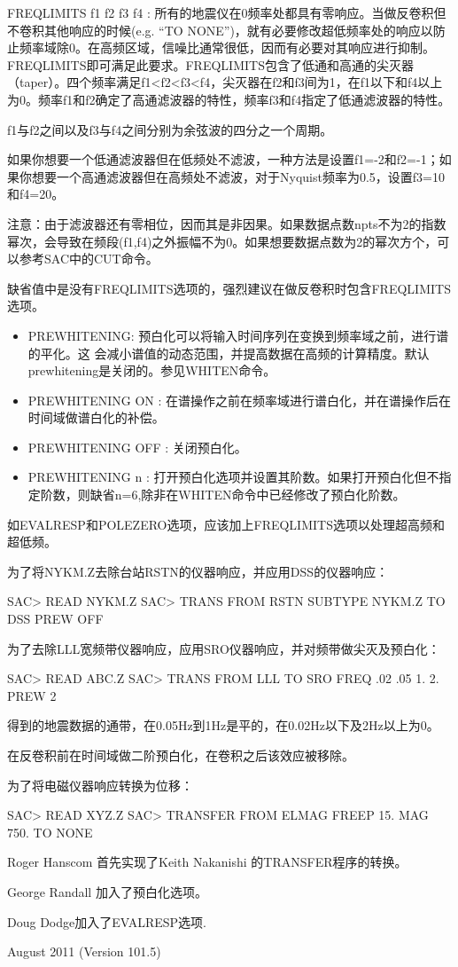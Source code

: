 FREQLIMITS f1 f2 f3 f4 : 所有的地震仪在0频率处都具有零响应。当做反卷积但不卷积其他响应的时候(e.g. ``TO NONE'')，就有必要修改超低频率处的响应以防止频率域除0。在高频区域，信噪比通常很低，因而有必要对其响应进行抑制。FREQLIMITS即可满足此要求。FREQLIMITS包含了低通和高通的尖灭器（taper）。四个频率满足f1<f2<f3<f4，尖灭器在f2和f3间为1，在f1以下和f4以上为0。频率f1和f2确定了高通滤波器的特性，频率f3和f4指定了低通滤波器的特性。

f1与f2之间以及f3与f4之间分别为余弦波的四分之一个周期。

如果你想要一个低通滤波器但在低频处不滤波，一种方法是设置f1=-2和f2=-1；如果你想要一个高通滤波器但在高频处不滤波，对于Nyquist频率为0.5，设置f3=10和f4=20。

注意：由于滤波器还有零相位，因而其是非因果。如果数据点数npts不为2的指数幂次，会导致在频段(f1,f4)之外振幅不为0。如果想要数据点数为2的幂次方个，可以参考SAC中的CUT命令。

缺省值中是没有FREQLIMITS选项的，强烈建议在做反卷积时包含FREQLIMITS选项。
\begin{itemize}
\item PREWHITENING: 预白化可以将输入时间序列在变换到频率域之前，进行谱的平化。这	会减小谱值的动态范围，并提高数据在高频的计算精度。默认prewhitening是关闭的。参见WHITEN命令。
\item PREWHITENING ON : 在谱操作之前在频率域进行谱白化，并在谱操作后在时间域做谱白化的补偿。
\item PREWHITENING OFF : 关闭预白化。
\item PREWHITENING n : 打开预白化选项并设置其阶数。如果打开预白化但不指定阶数，则缺省n=6,除非在WHITEN命令中已经修改了预白化阶数。
\end{itemize}


如EVALRESP和POLEZERO选项，应该加上FREQLIMITS选项以处理超高频和超低频。


为了将NYKM.Z去除台站RSTN的仪器响应，并应用DSS的仪器响应：
\begin{SACCode}
SAC> READ NYKM.Z
SAC> TRANS FROM RSTN SUBTYPE NYKM.Z TO DSS PREW OFF
\end{SACCode}  	

为了去除LLL宽频带仪器响应，应用SRO仪器响应，并对频带做尖灭及预白化：
\begin{SACCode}
SAC> READ ABC.Z
SAC> TRANS FROM LLL TO SRO FREQ .02 .05 1. 2. PREW 2
\end{SACCode}
得到的地震数据的通带，在0.05Hz到1Hz是平的，在0.02Hz以下及2Hz以上为0。

在反卷积前在时间域做二阶预白化，在卷积之后该效应被移除。

为了将电磁仪器响应转换为位移：
\begin{SACCode}
SAC>  READ XYZ.Z
SAC>  TRANSFER FROM ELMAG FREEP 15. MAG 750. TO NONE
\end{SACCode}

Roger Hanscom 首先实现了Keith Nakanishi 的TRANSFER程序的转换。

George 	Randall 加入了预白化选项。

Doug Dodge加入了EVALRESP选项.

August 2011 (Version 101.5) 
